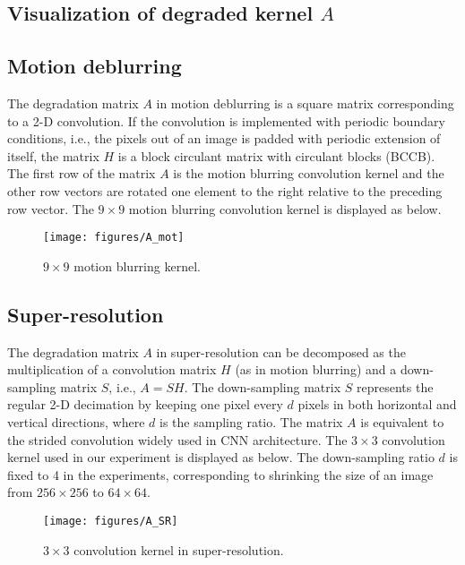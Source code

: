 \documentclass[10pt,twocolumn,letterpaper]{article}
\begin{document}
\begin{appendices}


\section{Visualization of degraded kernel $A$}

\subsection{Motion deblurring}
The degradation matrix $A$ in motion deblurring is a square matrix corresponding to a 2-D convolution.
If the convolution is implemented with periodic boundary conditions, i.e., the pixels out of an image is
padded with periodic extension of itself, the matrix $H$ is a block circulant matrix with circulant blocks (BCCB).
The first row of the matrix $A$ is the motion blurring convolution kernel and the other row vectors
are rotated one element to the right relative to the preceding row vector.
The $9 \times 9$ motion blurring convolution kernel is displayed as below.  
\begin{figure}[H]
\centering
\texttt{[image: figures/A\_mot]}
\caption{{$9 \times 9$ motion blurring kernel.}}
\label{fig:mot_kernel}
\end{figure}

\subsection{Super-resolution}
\label{subsec:sr}
The degradation matrix $A$ in super-resolution can be decomposed as the multiplication of  a 
convolution matrix $H$ (as in motion blurring) and a down-sampling matrix $S$, i.e., $A= SH$. 
The down-sampling matrix $S$ represents the regular 2-D decimation by keeping one pixel every
$d$ pixels in both horizontal and vertical directions, where $d$ is the sampling ratio. 
The matrix $A$ is equivalent to the strided convolution widely used in CNN architecture. 
The $3 \times 3$ convolution kernel used in our experiment is displayed as below.
The down-sampling ratio $d$ is fixed to 4 in the experiments, corresponding to shrinking the size
of an image from $256 \times 256$ to $64 \times 64$.

\begin{figure}[H]
\centering
\texttt{[image: figures/A\_SR]}
\caption{{$3 \times 3$ convolution kernel in super-resolution.}}
\label{fig:sr_kernel}
\end{figure}


\end{appendices}
\end{document}
